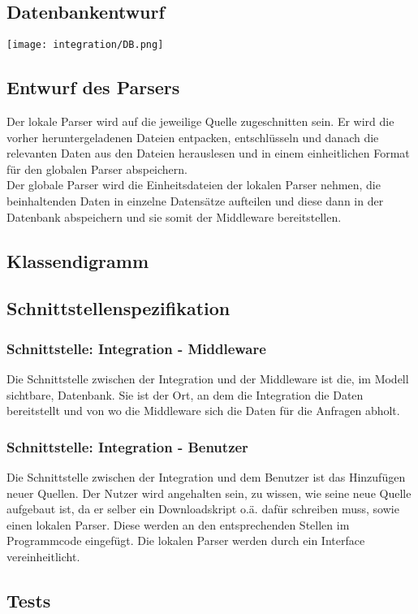 \documentclass{scrartcl}
\begin{document}
\subsection{Datenbankentwurf}
\texttt{[image: integration/DB.png]}
\subsection{Entwurf des Parsers}
Der lokale Parser wird auf die jeweilige Quelle zugeschnitten sein. Er wird die vorher heruntergeladenen Dateien entpacken, entschlüsseln und danach die relevanten Daten aus den Dateien herauslesen und in einem einheitlichen Format für den globalen Parser abspeichern.\\
Der globale Parser wird die Einheitsdateien der lokalen Parser nehmen, die beinhaltenden Daten in einzelne Datensätze aufteilen und diese dann in der Datenbank abspeichern und sie somit der Middleware bereitstellen.
\subsection{Klassendigramm}
\subsection{Schnittstellenspezifikation}
\subsubsection{Schnittstelle: Integration - Middleware}
Die Schnittstelle zwischen der Integration und der Middleware ist die, im Modell sichtbare, Datenbank. Sie ist der Ort, an dem die Integration die Daten bereitstellt und von wo die Middleware sich die Daten für die Anfragen abholt.
\subsubsection{Schnittstelle: Integration - Benutzer}
Die Schnittstelle zwischen der Integration und dem Benutzer ist das Hinzufügen neuer Quellen. Der Nutzer wird angehalten sein, zu wissen, wie seine neue Quelle aufgebaut ist, da er selber ein Downloadskript o.ä. dafür schreiben muss, sowie einen lokalen Parser. Diese werden an den entsprechenden Stellen im Programmcode eingefügt. Die lokalen Parser werden durch ein Interface vereinheitlicht.
\subsection{Tests}
\end{document}
